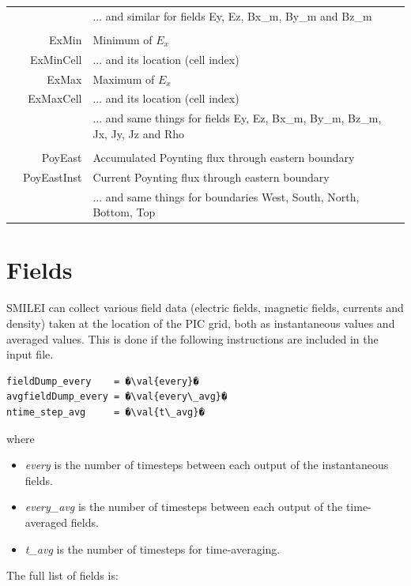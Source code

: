 \documentclass[11pt]{article}
\newcommand{\val}[1]{{\ttfamily \textit{#1}}}
\begin{document}
\begin{tabularx}{\textwidth}{X r | l X}
& & ... and similar for fields Ey, Ez, Bx\_m, By\_m and Bz\_m & \\
& & & \\
& ExMin & Minimum of $E_x$ & \\
& ExMinCell &  ... and its location (cell index) & \\
& ExMax & Maximum of $E_x$ & \\
& ExMaxCell &  ... and its location (cell index) & \\
& & ... and same things for fields Ey, Ez, Bx\_m, By\_m, Bz\_m, Jx, Jy, Jz and Rho & \\
& & & \\
& PoyEast & Accumulated Poynting flux through eastern boundary & \\
& PoyEastInst & Current Poynting flux through eastern boundary & \\
& & ... and same things for boundaries West, South, North, Bottom, Top &\\
\end{tabularx}
\vfill

\clearpage


\section{Fields\label{sec:fields}}

SMILEI can collect various field data (electric fields, magnetic fields, currents and density)
taken at the location of the PIC grid, both as instantaneous values and averaged values.
This is done if the following instructions are included in the input file.
\begin{lstlisting}
fieldDump_every    = �\val{every}�
avgfieldDump_every = �\val{every\_avg}�
ntime_step_avg     = �\val{t\_avg}�
\end{lstlisting}
where
\begin{itemize}
\item \val{every} is the number of timesteps between each output of the instantaneous fields.
\item \val{every\_avg} is the number of timesteps between each output of the time-averaged fields.
\item \val{t\_avg} is the number of timesteps for time-averaging.
\end{itemize}
\vspace{1cm}
The full list of fields is:\\
\end{document}
